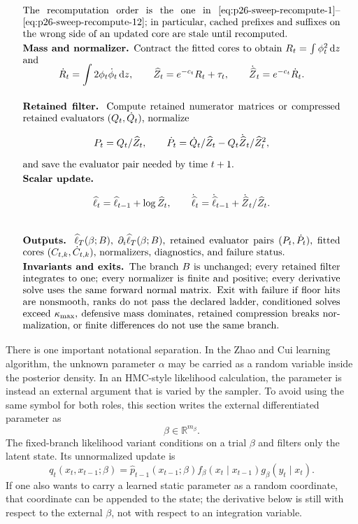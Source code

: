 \documentclass[11pt]{article}
\numberwithin{equation}{section}
\newcommand{\R}{\mathbb R}
\newcommand{\dd}{\,\mathrm d}
\newcommand{\widehatell}{\widehat\ell}
\begin{document}
\begin{equation}
{\begin{array}{p{0.94\linewidth}}
\[\]
The recomputation order is the one in
\eqref{eq:p26-sweep-recompute-1}--\eqref{eq:p26-sweep-recompute-12};
in particular, cached prefixes and suffixes on the wrong side of an updated
core are stale until recomputed.
\\[1mm]
\textbf{Mass and normalizer.}
Contract the fitted cores to obtain \(R_t=\int\phi_t^2\dd z\) and
\[
    \dot R_t=\int 2\phi_t\dot\phi_t\dd z,\qquad
    \widehat Z_t=e^{-c_t}R_t+\tau_t,\qquad
    \dot{\widehat Z}_t=e^{-c_t}\dot R_t.
\]
\\[1mm]
\textbf{Retained filter.}
Compute retained numerator matrices or compressed retained evaluators
\((Q_t,\dot Q_t)\), normalize
\[
    P_t=Q_t/\widehat Z_t,\qquad
    \dot P_t=\dot Q_t/\widehat Z_t-Q_t\dot{\widehat Z}_t/\widehat Z_t^2,
\]
and save the evaluator pair needed by time \(t+1\).
\\[1mm]
\textbf{Scalar update.}
\[
    \widehatell_t=\widehatell_{t-1}+\log\widehat Z_t,\qquad
    \dot{\widehatell}_t=\dot{\widehatell}_{t-1}
    +\dot{\widehat Z}_t/\widehat Z_t.
\]
\\[1mm]
\textbf{Outputs.}
\(\widehatell_T(\beta;B)\), \(\partial_i\widehatell_T(\beta;B)\),
retained evaluator pairs \((P_t,\dot P_t)\), fitted cores
\((C_{t,k},\dot C_{t,k})\), normalizers, diagnostics, and failure status.
\\[1mm]
\textbf{Invariants and exits.}
The branch \(B\) is unchanged; every retained filter integrates to one; every
normalizer is finite and positive; every derivative solve uses the same
forward normal matrix.  Exit with failure if floor hits are nonsmooth, ranks do
not pass the declared ladder, conditioned solves exceed \(\kappa_{\max}\),
defensive mass dominates, retained compression breaks normalization, or
finite differences do not use the same branch.
\end{array}}
\label{eq:p26-box-deriv-2}
\end{equation}

There is one important notational separation.  In the Zhao and Cui \cite{zhao2024ttsequential} learning
algorithm, the unknown parameter \(\alpha\) may be carried as a random variable
inside the posterior density.  In an HMC-style likelihood calculation, the
parameter is instead an external argument that is varied by the sampler.  To
avoid using the same symbol for both roles, this section writes the external
differentiated parameter as
\[
    \beta\in\R^{m_\beta}.
\]
The fixed-branch likelihood variant conditions on a trial \(\beta\) and filters
only the latent state.  Its unnormalized update is
\[
    q_t(x_t,x_{t-1};\beta)
    =
    \widehat p_{t-1}(x_{t-1};\beta)
    f_\beta(x_t\mid x_{t-1})
    g_\beta(y_t\mid x_t).
\]
If one also wants to carry a learned static parameter as a random coordinate,
that coordinate can be appended to the state; the derivative below is still
with respect to the external \(\beta\), not with respect to an integration
variable.
\end{document}
